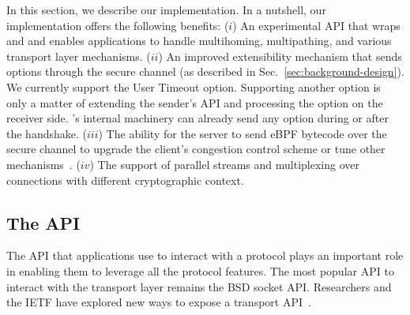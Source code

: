 \label{sec:content}


In this section, we describe our \tcpls implementation.  In a nutshell, our implementation offers the following benefits:
($i$) An experimental API that wraps \tls and \tcp and enables applications to
    handle multihoming, multipathing, and various transport layer mechanisms.
($ii$) An improved \tcp extensibility mechanism that sends \tcp options
   through the secure \tcpls channel (as described in Sec.~\ref{sec:background-design}). We currently support the \tcp User Timeout option. Supporting another \tcp option is only a matter of extending the sender's API and processing the option on the receiver side. \tcpls's internal machinery can already send any \tcp option during or after the handshake.
($iii$) The ability for the server to send eBPF bytecode over the secure
  channel to upgrade the client's \tcp congestion control scheme or
  tune other \tcp mechanisms~\cite{brakmo2017tcp, tran2019beyond}.
($iv$) The support of parallel streams and multiplexing over \tcp connections
  with different cryptographic context.


\subsection{The \tcpls API}

The API that applications use to interact with a protocol plays an important
role in enabling them to leverage all the protocol features. The most
popular API to interact with the transport layer remains the BSD socket
API. Researchers and the IETF have explored new ways to expose a transport API~\cite{draft-ietf-taps arch,hruby2014sockets,rfc6458,hesmans2016enhanced,schmidt2013socket}.

